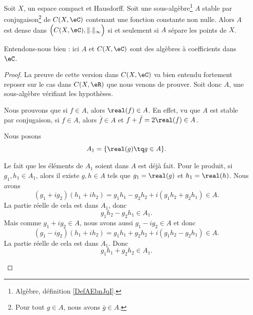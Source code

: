 \begin{theorem} \label{ThoWmAzSMF}
	Soit \( X\), un espace compact et Hausdorff. Soit une sous-algèbre\footnote{Algèbre, définition \ref{DefAEbnJqI}.} \( A\) stable par conjugaison\footnote{Pour tout \( g\in A\), nous avons \( \bar g\in A\).} de \( C(X,\eC)\) contenant une fonction constante non nulle. Alors \( A\) est dense dans \( \Big( C(X,\eC),\| . \|_{\infty}\Big)\) si et seulement si \( A\) sépare les points de \(X\).

	Entendons-nous bien : ici \( A\) et \( C(X,\eC)\) sont des algèbres à coefficients dans \( \eC\).
\end{theorem}

\begin{proof}
	La preuve de cette version dans \( C(X,\eC)\) va bien entendu fortement reposer sur le cas dans \( C(X,\eR)\) que nous venons de prouver. Soit donc \( A\), une sous-algèbre vérifiant les hypothèses.
	\begin{subproof}
		Nous prouvons que si \( f\in A\), alors \( \real(f)\in A\). En effet, vu que \( A\) est stable par conjugaison, si \( f\in A\), alors \( \bar f\in A\) et \( f+\bar f=2\real(f)\in A\).
	\end{subproof}
	Nous posons
	\begin{equation}
		A_1=\{ \real(g)\tq g\in A \}.
	\end{equation}
	\begin{subproof}
		Le fait que les éléments de \( A_1\) soient dans \( A\) est déjà fait. Pour le produit, si \( g_1,h_1\in A_1\), alors il existe \( g,h\in A\) tels que \( g_1=\real(g)\) et \( h_1=\real(h)\). Nous avons
		\begin{equation}
			(g_1+ig_2)(h_1+ih_2)=g_1h_1-g_2h_2+i(g_1h_2+g_2h_1)\in A.
		\end{equation}
		La partie réelle de cela est dans \( A_1\), donc
		\begin{equation}        \label{EQooYAGUooJVpaEa}
			g_1h_2-g_2h_1\in A_1.
		\end{equation}
		Mais comme \( g_1+ig_2\in A\), nous avons aussi \( g_1-ig_2\in A \) et donc
		\begin{equation}
			(g_1-ig_2)(h_1+ih_2)=g_1h_1+g_2h_2+i(g_1h_2-g_2h_1)\in A.
		\end{equation}
		La partie réelle de cela est dans \( A_1\). Donc
		\begin{equation}
			g_1h_1+g_2h_2\in A_1.
		\end{equation}

\end{subproof}
\end{proof}
